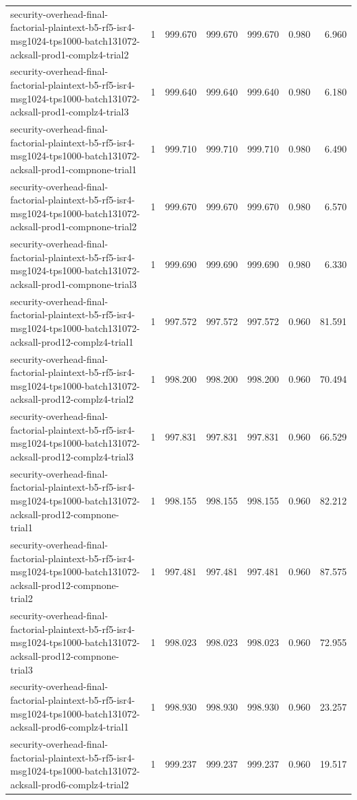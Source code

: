 \begin{tabular}{lrrrrrr}
security-overhead-final-factorial-plaintext-b5-rf5-isr4-msg1024-tps1000-batch131072-acksall-prod1-complz4-trial2 & 1 & 999.670 & 999.670 & 999.670 & 0.980 & 6.960 \\
security-overhead-final-factorial-plaintext-b5-rf5-isr4-msg1024-tps1000-batch131072-acksall-prod1-complz4-trial3 & 1 & 999.640 & 999.640 & 999.640 & 0.980 & 6.180 \\
security-overhead-final-factorial-plaintext-b5-rf5-isr4-msg1024-tps1000-batch131072-acksall-prod1-compnone-trial1 & 1 & 999.710 & 999.710 & 999.710 & 0.980 & 6.490 \\
security-overhead-final-factorial-plaintext-b5-rf5-isr4-msg1024-tps1000-batch131072-acksall-prod1-compnone-trial2 & 1 & 999.670 & 999.670 & 999.670 & 0.980 & 6.570 \\
security-overhead-final-factorial-plaintext-b5-rf5-isr4-msg1024-tps1000-batch131072-acksall-prod1-compnone-trial3 & 1 & 999.690 & 999.690 & 999.690 & 0.980 & 6.330 \\
security-overhead-final-factorial-plaintext-b5-rf5-isr4-msg1024-tps1000-batch131072-acksall-prod12-complz4-trial1 & 1 & 997.572 & 997.572 & 997.572 & 0.960 & 81.591 \\
security-overhead-final-factorial-plaintext-b5-rf5-isr4-msg1024-tps1000-batch131072-acksall-prod12-complz4-trial2 & 1 & 998.200 & 998.200 & 998.200 & 0.960 & 70.494 \\
security-overhead-final-factorial-plaintext-b5-rf5-isr4-msg1024-tps1000-batch131072-acksall-prod12-complz4-trial3 & 1 & 997.831 & 997.831 & 997.831 & 0.960 & 66.529 \\
security-overhead-final-factorial-plaintext-b5-rf5-isr4-msg1024-tps1000-batch131072-acksall-prod12-compnone-trial1 & 1 & 998.155 & 998.155 & 998.155 & 0.960 & 82.212 \\
security-overhead-final-factorial-plaintext-b5-rf5-isr4-msg1024-tps1000-batch131072-acksall-prod12-compnone-trial2 & 1 & 997.481 & 997.481 & 997.481 & 0.960 & 87.575 \\
security-overhead-final-factorial-plaintext-b5-rf5-isr4-msg1024-tps1000-batch131072-acksall-prod12-compnone-trial3 & 1 & 998.023 & 998.023 & 998.023 & 0.960 & 72.955 \\
security-overhead-final-factorial-plaintext-b5-rf5-isr4-msg1024-tps1000-batch131072-acksall-prod6-complz4-trial1 & 1 & 998.930 & 998.930 & 998.930 & 0.960 & 23.257 \\
security-overhead-final-factorial-plaintext-b5-rf5-isr4-msg1024-tps1000-batch131072-acksall-prod6-complz4-trial2 & 1 & 999.237 & 999.237 & 999.237 & 0.960 & 19.517 \\

\end{tabular}
